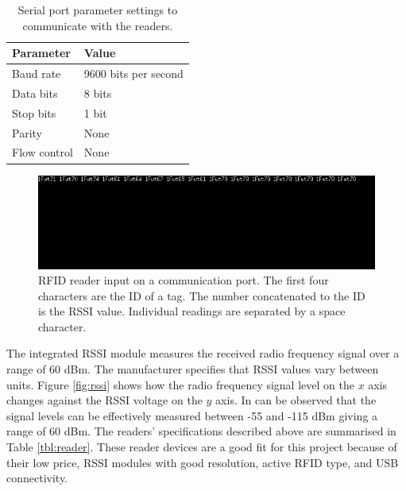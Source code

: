 \begin{table}[h]
	\centering
	\begin{tabular}{ | m{4cm} || m{4cm} | }
		\hline
		\textbf{Parameter}		& \textbf{Value} \\ \hline
		Baud rate				& 9600 bits per second \\ \hline
		Data bits				& 8 bits \\ \hline
		Stop bits				& 1 bit \\ \hline
		Parity					& None \\ \hline
		Flow control			& None \\ \hline
	\end{tabular}
	\caption{Serial port parameter settings to communicate with the readers.}
	\label{tbl:comm}
\end{table}

\begin{figure}[h]
	\begin{center}
		\includegraphics[width=1\textwidth]{figures/com}
		\caption{RFID reader input on a communication port. The first four characters are the ID of a tag. The number concatenated to the ID is the RSSI value. Individual readings are separated by a space character.}
		\label{fig:comm}
	\end{center}
\end{figure}

The integrated RSSI module measures the received radio frequency signal over a range of 60 dBm. The manufacturer specifies that RSSI values vary between units\footnotemark[2].  Figure \ref{fig:rssi} shows how the radio frequency signal level on the $x$ axis changes against the RSSI voltage on the $y$ axis. In can be observed that the signal levels can be effectively measured between -55 and -115 dBm giving a range of 60 dBm. The readers' specifications described above are summarised in Table \ref{tbl:reader}. These reader devices are a good fit for this project because of their low price, RSSI modules with good resolution, active RFID type, and USB connectivity.

